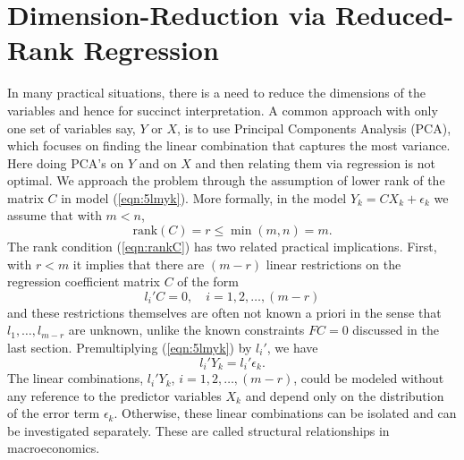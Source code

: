 \section{Dimension-Reduction via Reduced-Rank Regression \label{sec:s_dr}}


In many practical situations, there is a need to reduce the dimensions of the variables and hence for succinct interpretation. A common approach with only one set of variables say, $Y$ or $X$, is to use Principal Components Analysis (PCA), which focuses on finding the linear combination that captures the most variance. Here doing PCA's on $Y$ and on $X$ and then relating them via regression is not optimal. We approach the problem through the assumption of lower rank of the matrix $C$ in model (\ref{eqn:5lmyk}). More formally, in the model $Y_k=CX_k+\epsilon_k$ we assume that with $m<n$,
	\begin{equation}\label{eqn:rankC}
	\text{rank}(C)= r \leq \min(m,n)= m.
	\end{equation}
The rank condition (\ref{eqn:rankC}) has two related practical implications. First, with $r<m$ it implies that there are $(m-r)$ linear restrictions on the regression coefficient matrix $C$ of the form
	\begin{equation}\label{eqn:lprimeC}
	l_i'C=0, \quad i=1,2,\ldots,(m-r)
	\end{equation}
and these restrictions themselves are often not known a priori in the sense that $l_1,\ldots,l_{m-r}$ are unknown, unlike the known constraints $FC=0$ discussed in the last section. Premultiplying (\ref{eqn:5lmyk})	by $l_i'$, we have
	\begin{equation}\label{eqn:lprimeY}
	l_i'Y_k=l_i'\epsilon_k.
	\end{equation}
The linear combinations, $l_i'Y_k$, $i=1,2,\ldots,(m-r)$, could be modeled without any reference to the predictor variables $X_k$ and depend only on the distribution of the error term $\epsilon_k$. Otherwise, these linear combinations can be isolated and can be investigated separately. These are called structural relationships in macroeconomics. 


